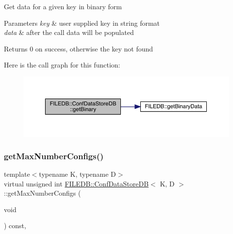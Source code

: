 Get data for a given key in binary form


\begin{DoxyParams}{Parameters}
{\em key} & user supplied key in string format \\
\hline
{\em data} & after the call data will be populated \\
\hline
\end{DoxyParams}
\begin{DoxyReturn}{Returns}
0 on success, otherwise the key not found 
\end{DoxyReturn}
Here is the call graph for this function\+:
\nopagebreak
\begin{figure}[H]
\begin{center}
\leavevmode
\includegraphics[width=350pt]{d8/d19/classFILEDB_1_1ConfDataStoreDB_a971e372585c497dad3b1bc589bc4dd15_cgraph}
\end{center}
\end{figure}
\mbox{\label{classFILEDB_1_1ConfDataStoreDB_a89337b5034d8f87b4a37ceb05ea99d3a}} 
\subsubsection{\texorpdfstring{getMaxNumberConfigs()}{getMaxNumberConfigs()}\hspace{0.1cm}{\footnotesize\ttfamily [1/2]}}
{\footnotesize\ttfamily template$<$typename K, typename D$>$ \\
virtual unsigned int \mbox{\hyperlink{classFILEDB_1_1ConfDataStoreDB}{F\+I\+L\+E\+D\+B\+::\+Conf\+Data\+Store\+DB}}$<$ K, D $>$\+::get\+Max\+Number\+Configs (\begin{DoxyParamCaption}\item[{void}]{ }\end{DoxyParamCaption}) const\hspace{0.3cm}{\ttfamily [inline]}, {\ttfamily [virtual]}}

